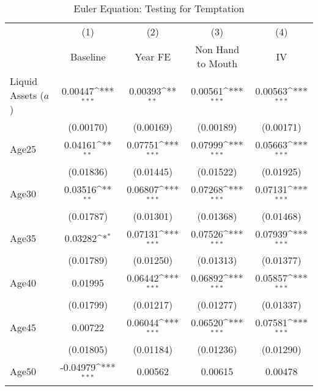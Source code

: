 {
\def\sym#1{\ifmmode^{#1}\else\(^{#1}\)\fi}
\begin{longtable}{l*{4}{c}}
\caption{Euler Equation: Testing for Temptation}\\
\toprule\endfirsthead\midrule\endhead\midrule\endfoot\endlastfoot
                    &\multicolumn{1}{c}{(1)}&\multicolumn{1}{c}{(2)}&\multicolumn{1}{c}{(3)}&\multicolumn{1}{c}{(4)}\\
                    &\multicolumn{1}{c}{Baseline}&\multicolumn{1}{c}{Year FE}&\multicolumn{1}{c}{Non Hand to Mouth}&\multicolumn{1}{c}{IV}\\
\midrule
Liquid Assets ($ a $) $\;\;\;\;\;\;\;\;\;\;\;\;$&     0.00447\sym{***}&     0.00393\sym{**} &     0.00561\sym{***}&     0.00563\sym{***}\\
                    &   (0.00170)         &   (0.00169)         &   (0.00189)         &   (0.00171)         \\
\addlinespace
Age25               &     0.04161\sym{**} &     0.07751\sym{***}&     0.07999\sym{***}&     0.05663\sym{***}\\
                    &   (0.01836)         &   (0.01445)         &   (0.01522)         &   (0.01925)         \\
\addlinespace
Age30               &     0.03516\sym{**} &     0.06807\sym{***}&     0.07268\sym{***}&     0.07131\sym{***}\\
                    &   (0.01787)         &   (0.01301)         &   (0.01368)         &   (0.01468)         \\
\addlinespace
Age35               &     0.03282\sym{*}  &     0.07131\sym{***}&     0.07526\sym{***}&     0.07939\sym{***}\\
                    &   (0.01789)         &   (0.01250)         &   (0.01313)         &   (0.01377)         \\
\addlinespace
Age40               &     0.01995         &     0.06442\sym{***}&     0.06892\sym{***}&     0.05857\sym{***}\\
                    &   (0.01799)         &   (0.01217)         &   (0.01277)         &   (0.01337)         \\
\addlinespace
Age45               &     0.00722         &     0.06044\sym{***}&     0.06520\sym{***}&     0.07581\sym{***}\\
                    &   (0.01805)         &   (0.01184)         &   (0.01236)         &   (0.01290)         \\
\addlinespace
Age50               &    -0.04979\sym{***}&     0.00562         &     0.00615         &     0.00478         \\

\end{longtable}}
